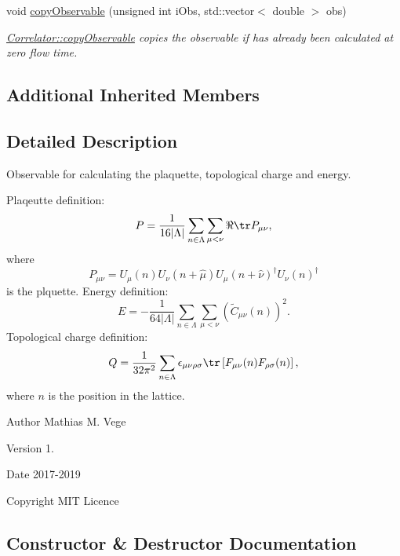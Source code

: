 \begin{DoxyCompactItemize}
void \mbox{\hyperlink{class_master_sampler_a893be9ba7dca98cb8d9d3cb30e42fcc3}{copy\+Observable}} (unsigned int i\+Obs, std\+::vector$<$ double $>$ obs)
\begin{DoxyCompactList}\small\item\em \mbox{\hyperlink{class_correlator_ac780d8b180294ee4801ede6e6a13f7f4}{Correlator\+::copy\+Observable}} copies the observable if has already been calculated at zero flow time. \end{DoxyCompactList}\end{DoxyCompactItemize}
\subsection*{Additional Inherited Members}


\subsection{Detailed Description}
Observable for calculating the plaquette, topological charge and energy. 

Plaqeutte definition\+: \[ P = \frac{1}{16|\Lambda|} \sum_{n\in\Lambda} \sum_{\mu < \nu} \Re \tr P_{\mu\nu}, \] where \[ P_{\mu\nu}=U_\mu(n) U_{\nu}(n+\hat{\mu}) U_{\mu}(n+\hat{\nu})^\dagger U_{\nu} (n)^\dagger \] is the plquette. Energy definition\+: \[ E = -\frac{1}{64|\Lambda|} \sum_{n\in\Lambda} \sum_{\mu<\nu} \left(\tilde{C}_{\mu\nu}(n)\right)^2. \] Topological charge definition\+: \[ Q = \frac{1}{32\pi^2} \sum_{n\in\Lambda} \epsilon_{\mu\nu\rho\sigma} \tr\left[F_{\mu\nu}(n)F_{\rho\sigma}(n)\right], \] where $n$ is the position in the lattice.

\begin{DoxyAuthor}{Author}
Mathias M. Vege 
\end{DoxyAuthor}
\begin{DoxyVersion}{Version}
1. 
\end{DoxyVersion}
\begin{DoxyDate}{Date}
2017-\/2019 
\end{DoxyDate}
\begin{DoxyCopyright}{Copyright}
M\+IT Licence 
\end{DoxyCopyright}


\subsection{Constructor \& Destructor Documentation}
\mbox{\label{class_master_sampler_ac5ee503e8391aca36f73872a45bb6bd9}} 
